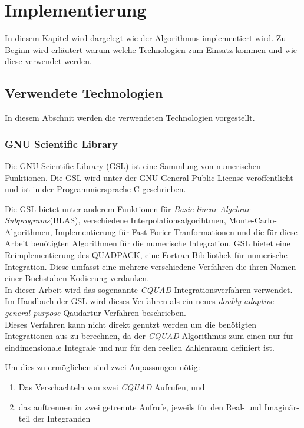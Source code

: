 \chapter{Implementierung}\label{impl}

In diesem Kapitel wird dargelegt wie der Algorithmus implementiert wird. Zu Beginn wird erläutert warum welche Technologien zum Einsatz kommen und wie diese verwendet werden.
\section{Verwendete Technologien}

In diesem Abschnit werden die verwendeten Technologien vorgestellt. 


\subsection{GNU Scientific Library}

Die GNU Scientific Library (GSL) ist eine Sammlung von numerischen Funktionen\cite{gsl}. Die GSL wird unter der GNU General Public License veröffentlicht und ist in der Programmiersprache C geschrieben.

Die GSL bietet unter anderem Funktionen für \textit{Basic linear Algebrar Subprograms}(BLAS), verschiedene Interpolationsalgorihtmen, Monte-Carlo-Algorithmen, Implementierung für Fast Forier Tranformationen und die für diese 
Arbeit benötigten Algorithmen für die numerische Integration.
GSL bietet eine Reimplementierung des QUADPACK\cite{quadpack}, eine Fortran Bibiliothek für numerische Integration.
Diese umfasst eine mehrere verschiedene Verfahren die ihren Namen einer Buchstaben Kodierung verdanken.
\\
In dieser Arbeit wird das sogenannte \textit{CQUAD}-Integrationsverfahren verwendet.
Im Handbuch der GSL wird dieses Verfahren als ein neues \textit{doubly-adaptive general-purpose}-Qaudartur-Verfahren \cite*[Kapitel 17.11]{gsl} beschrieben.
\\
Dieses Verfahren kann nicht direkt genutzt werden um die benötigten Integrationen aus \cite*{gasperini:hal-03209144} zu berechnen, da 
der \textit{CQUAD}-Algorithmus zum einen nur für eindimensionale Integrale und nur für den reellen Zahlenraum definiert ist.

Um dies zu ermöglichen sind zwei Anpassungen nötig:
\begin{enumerate}
    \item Das Verschachteln von zwei \textit{CQUAD} Aufrufen, und
    \item das auftrennen in zwei getrennte Aufrufe, jeweils für den Real- und Imaginär-teil der Integranden
\end{enumerate}

